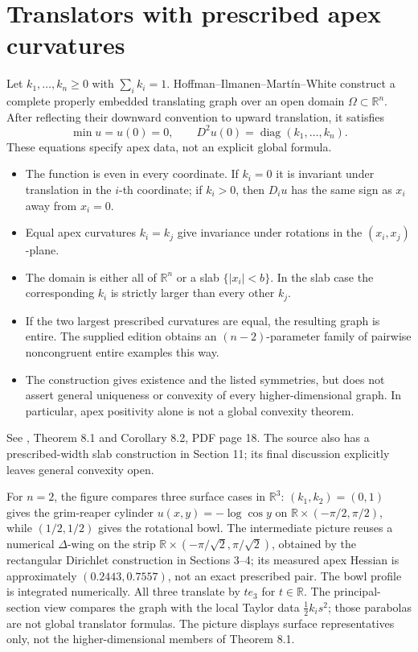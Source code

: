 \chapter{Translators with prescribed apex curvatures}\label{sec:catalogue-prescribed-apex-translators}
\begin{example}\label{ex:catalogue-prescribed-apex-translators}
Let $k_1,\ldots,k_n\geq0$ with $\sum_i k_i=1$. Hoffman--Ilmanen--Mart\'in--White construct a complete properly embedded translating graph over an open domain $\Omega\subset\mathbb R^n$. After reflecting their downward convention to upward translation, it satisfies
\[
 \min u=u(0)=0,\qquad D^2u(0)=\operatorname{diag}(k_1,\ldots,k_n).
\]
These equations specify apex data, not an explicit global formula.
\begin{itemize}
\item The function is even in every coordinate. If $k_i=0$ it is invariant under translation in the $i$-th coordinate; if $k_i>0$, then $D_i u$ has the same sign as $x_i$ away from $x_i=0$.
\item Equal apex curvatures $k_i=k_j$ give invariance under rotations in the $(x_i,x_j)$-plane.
\item The domain is either all of $\mathbb R^n$ or a slab $\{|x_i|<b\}$. In the slab case the corresponding $k_i$ is strictly larger than every other $k_j$.
\item If the two largest prescribed curvatures are equal, the resulting graph is entire. The supplied edition obtains an $(n-2)$-parameter family of pairwise noncongruent entire examples this way.
\item The construction gives existence and the listed symmetries, but does not assert general uniqueness or convexity of every higher-dimensional graph. In particular, apex positivity alone is not a global convexity theorem.
\end{itemize}
See \cite{CatHIMWGraphical18}, Theorem 8.1 and Corollary 8.2, PDF page 18. The source also has a prescribed-width slab construction in Section 11; its final discussion explicitly leaves general convexity open.

For $n=2$, the figure compares three surface cases in $\mathbb R^3$: $(k_1,k_2)=(0,1)$ gives the grim-reaper cylinder $u(x,y)=-\log\cos y$ on $\mathbb R\times(-\pi/2,\pi/2)$, while $(1/2,1/2)$ gives the rotational bowl. The intermediate picture reuses a numerical $\Delta$-wing on the strip $\mathbb R\times(-\pi/\sqrt2,\pi/\sqrt2)$, obtained by the rectangular Dirichlet construction in Sections 3--4; its measured apex Hessian is approximately $(0.2443,0.7557)$, not an exact prescribed pair. The bowl profile is integrated numerically. All three translate by $t e_3$ for $t\in\mathbb R$. The principal-section view compares the graph with the local Taylor data $\frac12 k_i s^2$; those parabolas are not global translator formulas. The picture displays surface representatives only, not the higher-dimensional members of Theorem 8.1.
\end{example}


